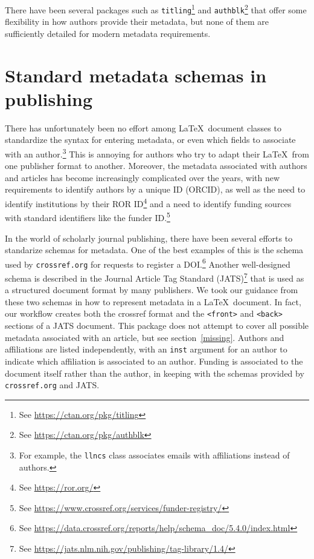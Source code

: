 \documentclass{article}
\newcommand{\pkg}[1]{\texttt{#1}}
\begin{document}
There have been several packages such
as \pkg{titling}\footnote{See \url{https://ctan.org/pkg/titling}}
and \pkg{authblk}\footnote{See \url{https://ctan.org/pkg/authblk}}
that offer some flexibility in how authors provide their metadata, but
none of them are sufficiently detailed for modern metadata
requirements.

\section{Standard metadata schemas in publishing}
There has unfortunately been no effort among \LaTeX\ document classes
to standardize the syntax for entering metadata, or even which fields
to associate with an author.\footnote{For example, the \pkg{llncs}
class associates emails with affiliations instead of authors.}
This is annoying for authors who try to adapt their \LaTeX\ from one
publisher format to another. Moreover, the metadata associated with authors
and articles has become increasingly complicated over the years, with
new requirements to identify authors by a unique ID (ORCID), as well
as the need to identify institutions by their ROR ID\footnote{See \url{https://ror.org/}}
and a need to identify funding sources with standard identifiers like the
funder ID.\footnote{See \url{https://www.crossref.org/services/funder-registry/}}

In the world of scholarly journal publishing, there have been several efforts to
standarize schemas for metadata. One of the best examples
of this is the schema used by \texttt{crossref.org} for requests to
register a DOI.\footnote{See
\url{https://data.crossref.org/reports/help/schema_doc/5.4.0/index.html}}
Another well-designed schema is described in the Journal Article Tag
Standard
(JATS)\footnote{See \url{https://jats.nlm.nih.gov/publishing/tag-library/1.4/}}
that is used as a structured document format by many publishers. We
took our guidance from these two schemas in how to represent metadata
in a \LaTeX\ document. In fact, our workflow creates both the crossref
format and the \texttt{<front>} and \texttt{<back>} sections of a JATS
document.  This package does not attempt to cover all possible
metadata associated with an article, but see
section~\ref{missing}. Authors and affiliations are listed
independently, with an \texttt{inst} argument for an author to indicate which
affiliation is associated to an author. Funding is associated to the
document itself rather than the author, in keeping with the schemas
provided by \texttt{crossref.org} and JATS.
\end{document}
